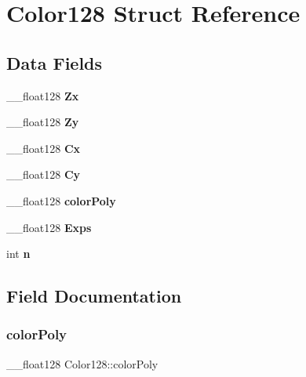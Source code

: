 \hypertarget{struct_color128}{}\section{Color128 Struct Reference}
\label{struct_color128}
\subsection*{Data Fields}
\begin{DoxyCompactItemize}
\item 
\mbox{\label{struct_color128_a1b9594bb49e14fb65892cb73b76cfdad}} 
\+\_\+\+\_\+float128 {\bfseries Zx}
\item 
\mbox{\label{struct_color128_a7fc499c167fb236d20ad9b2e6052b4b3}} 
\+\_\+\+\_\+float128 {\bfseries Zy}
\item 
\mbox{\label{struct_color128_a9c7a57c32aa6d05bac44b977d83261b2}} 
\+\_\+\+\_\+float128 {\bfseries Cx}
\item 
\mbox{\label{struct_color128_ac7bd2873d9dcc9496c30762846e9357a}} 
\+\_\+\+\_\+float128 {\bfseries Cy}
\item 
\mbox{\label{struct_color128_aad976108c20d5dac944813afb39e1b39}} 
\+\_\+\+\_\+float128 {\bfseries color\+Poly}
\item 
\mbox{\label{struct_color128_a3895ee8a70d847ed619c50b24c8302d1}} 
\+\_\+\+\_\+float128 {\bfseries Exps}
\item 
\mbox{\label{struct_color128_a75ba840a2e2fa86970dbbe43b2a6acff}} 
int {\bfseries n}
\end{DoxyCompactItemize}


\subsection{Field Documentation}
\mbox{\label{struct_color128_aad976108c20d5dac944813afb39e1b39}} 
\subsubsection{\texorpdfstring{color\+Poly}{colorPoly}}
{\footnotesize\ttfamily \+\_\+\+\_\+float128 Color128\+::color\+Poly}

